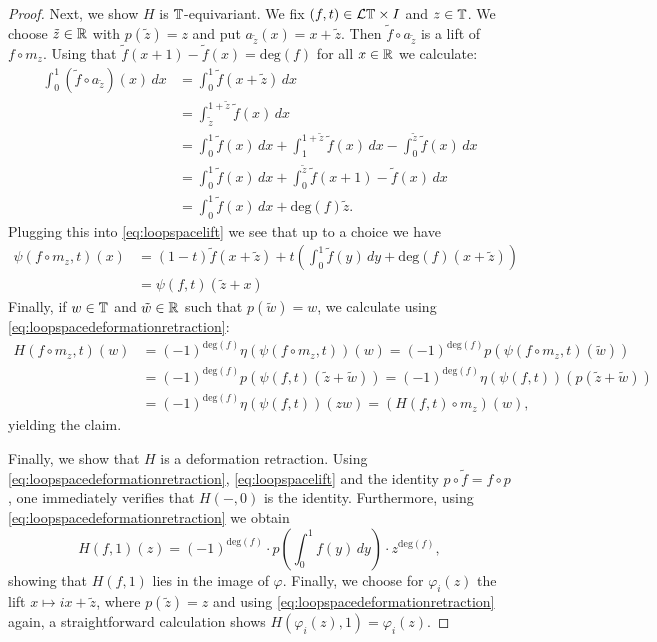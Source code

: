 \begin{proof}
Next, we show $H$ is $\mathbb{T}$-equivariant. We fix $(f,t)\in \mathcal{L}\mathbb{T}\times I$
and $z\in \mathbb{T}$. We choose $\tilde z\in \mathbb{R}$ with $p(\tilde z) = z$
and put $a_{\tilde z}(x) = x+\tilde z$. Then $\tilde f\circ a_{\tilde z}$
is a lift of $f\circ m_z$. Using that $\tilde f(x+1) - \tilde f(x) = \mathrm{deg}(f)$ for 
all $x\in \mathbb{R}$ we calculate:
\begin{align*}
\int_0^1 (\tilde f\circ a_{\tilde z})(x) \, dx &= \int_0^1 \tilde f(x+\tilde z) \, dx\\
&=\int_{\tilde z}^{1+\tilde z} \tilde f(x) \, dx\\
&=\int_0^{1} \tilde f(x) \, dx + \int_1^{1+\tilde z} \tilde f(x) \, dx - \int_0^{\tilde z} \tilde f(x) \, dx\\
&=\int_0^{1} \tilde f(x) \, dx + \int_0^{\tilde z} \tilde f(x+1) - \tilde f(x) \, dx\\
&=\int_0^{1} \tilde f(x) \, dx + \mathrm{deg}(f)\tilde z.
\end{align*}
Plugging this into \eqref{eq:loopspacelift} we see that up to a choice
we have
\begin{align*}
\psi(f\circ m_z,t)(x) &= (1-t)\tilde f(x+\tilde z) + t\left(\int_0^1 \tilde f(y)\,dy + \mathrm{deg}(f)(x+\tilde z)\right)\\
&= \psi(f,t)(\tilde z + x)
\end{align*}
Finally, if $w\in \mathbb{T}$ and $\tilde w\in \mathbb{R}$ such that $p(\tilde w) = w$,
we calculate using \eqref{eq:loopspacedeformationretraction}:
\begin{align*}
H(f\circ m_z,t)(w) &= (-1)^{\mathrm{deg}(f)} \eta(\psi(f\circ m_z,t))(w) 
=(-1)^{\mathrm{deg}(f)} p(\psi(f\circ m_z,t)(\tilde w)) \\
&= (-1)^{\mathrm{deg}(f)} p(\psi(f,t)(\tilde z + \tilde w))
= (-1)^{\mathrm{deg}(f)} \eta(\psi(f,t))(p(\tilde z + \tilde w))\\
&=(-1)^{\mathrm{deg}(f)}  \eta(\psi(f,t))(zw)
= (H(f,t)\circ m_z)(w),
\end{align*}
yielding the claim.

Finally, we show that $H$ is a deformation retraction. Using \eqref{eq:loopspacedeformationretraction},
\eqref{eq:loopspacelift} and the identity $p\circ \tilde f = f\circ p$, one immediately verifies
that $H(-,0)$ is the identity. Furthermore, using \eqref{eq:loopspacedeformationretraction}
we obtain
\[
H(f,1)(z) = (-1)^{\mathrm{deg}(f)}\cdot p\left(\int_0^1 f(y)\,dy\right)\cdot z^{\mathrm{deg}(f)},
\]
showing that $H(f,1)$ lies in the image of $\varphi$. Finally, we choose for 
$\varphi_i(z)$ the lift $x\mapsto ix +\tilde z$, where $p(\tilde z) = z$
and using  \eqref{eq:loopspacedeformationretraction} again,
a straightforward calculation shows $H(\varphi_i(z),1) = \varphi_i(z)$.


\end{proof}
